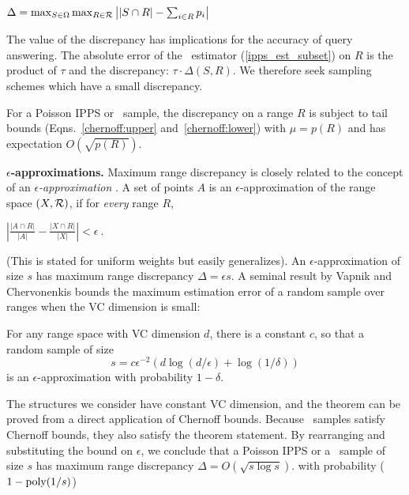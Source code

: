 \documentclass[11pt]{article}
\begin{document}
\smallskip
\centerline{$
\Delta = \max_{S\in\Omega} \max_{ R\in \mathcal{R}} \big\vert |S\cap R| - \sum_{i\in R} p_i \big\vert\ $}


\smallskip
The value of the discrepancy has implications for the accuracy of
query answering. 
The absolute error of the \HT\ estimator (\ref{ipps_est_subset}) on $R$ is
the product of $\tau$ and the discrepancy: $\tau \cdot \Delta(S,R)$.
We therefore seek sampling schemes which have a small discrepancy. 

For a Poisson IPPS or \varopt\ sample, the discrepancy on a range $R$ 
is subject to tail bounds (Eqns.~\eqref{chernoff:upper}
and~\eqref{chernoff:lower}) with $\mu=p(R)$ and has expectation $O(\sqrt{p(R)})$.

\medskip
\noindent
{\bf $\epsilon$-approximations.}
Maximum range discrepancy 
is closely related to the concept of an 
{\em $\epsilon$-approximation} \cite{VCepsapprox:1971}.  
A set of points $A$ is an 
$\epsilon$-approximation of the range space $(X,\mathcal{R})$, if for
 {\em every} range $R$,

\smallskip
\centerline{
$\left\vert \frac{|A \cap R|}{|A|}-\frac{|X\cap R|}{|X|} \right\vert <
  \epsilon\ .$}

\smallskip
(This is stated for uniform weights but easily generalizes).
An $\epsilon$-approximation of size $s$ has 
maximum range discrepancy $\Delta=\epsilon s$.  
A seminal result by Vapnik and Chervonenkis bounds the maximum
estimation error of a random sample over ranges when the VC dimension
is small: 
\begin{theorem} \label{VCapprox} 
For any range space with VC dimension $d$, there is a constant $c$, 
so that a random sample of size 
$$s = c\epsilon^{-2}(d\log(d/\epsilon) +
\log(1/\delta))$$
\noindent
 is an $\epsilon$-approximation with probability $1-\delta$.  
\end{theorem}
The structures we consider have constant VC dimension, and the theorem
can be proved from a direct application of Chernoff bounds. 
Because \varopt\ samples satisfy Chernoff bounds, they also satisfy
the theorem statement.  
By rearranging and substituting the bound on $\epsilon$, 
we conclude that a Poisson IPPS or a \varopt\ sample of size $s$ has
maximum
 range discrepancy  
$\Delta=O(\sqrt{s\log s})$.  
 with probability ($1-\textnormal{poly}(1/s)$) 

\end{document}
